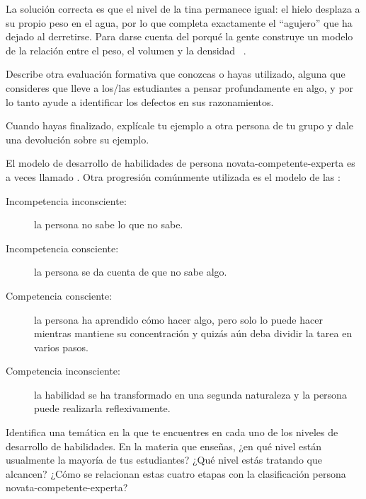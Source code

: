 
La solución correcta es que el nivel de la tina permanece igual:
el hielo desplaza a su propio peso en el agua,
por lo que completa exactamente el ``agujero'' que ha dejado al derretirse.
Para darse cuenta del porqué la gente construye un modelo de la relación entre el peso, el volumen y la densidad ~\cite{Epst2002}.

Describe otra evaluación formativa que conozcas o hayas utilizado,
alguna que consideres que lleve a los/las estudiantes a pensar profundamente en algo,
y por lo tanto ayude a identificar los defectos en sus razonamientos.

Cuando hayas finalizado,
explícale tu ejemplo a otra persona de tu grupo
y dale una devolución sobre su ejemplo.

El modelo de desarrollo de habilidades de persona novata-competente-experta
es a veces llamado
.
Otra progresión comúnmente utilizada es el modelo de las :

\begin{description}

\item[Incompetencia inconsciente:]
  la persona no sabe lo que no sabe.

\item[Incompetencia consciente:]
  la persona se da cuenta de que no sabe algo.

\item[Competencia consciente:]
la persona ha aprendido cómo hacer algo,
pero solo lo puede hacer mientras mantiene su concentración
y quizás aún deba dividir la tarea en varios pasos.

\item[Competencia inconsciente:]
  la habilidad se ha transformado en una segunda naturaleza
y la persona puede realizarla reflexivamente.

\end{description}

Identifica una temática en la que te encuentres en cada uno de los niveles de desarrollo de habilidades.
En la materia que enseñas, ¿en qué nivel están usualmente la mayoría de tus estudiantes?
¿Qué nivel estás tratando que alcancen?
¿Cómo se relacionan estas cuatro etapas con la clasificación persona novata-competente-experta?

